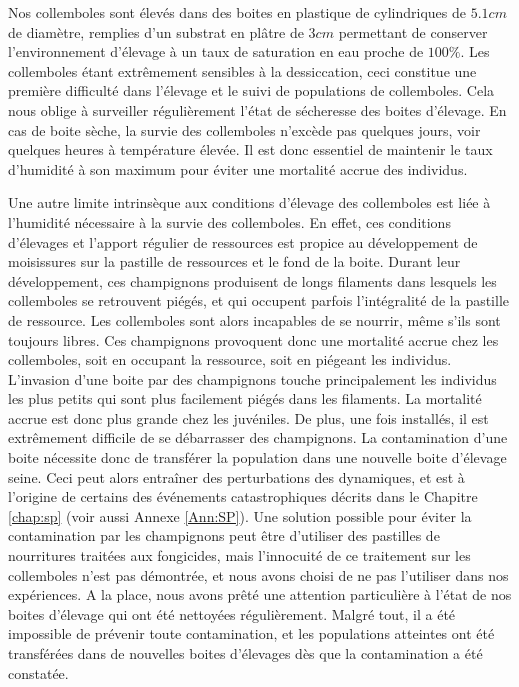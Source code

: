 Nos collemboles sont élevés dans des boites en plastique de cylindriques de
$5.1cm$ de diamètre, remplies d'un substrat en plâtre de $3cm$ permettant de
conserver l'environnement d'élevage à un taux de saturation en eau proche de $100\%$.
Les collemboles étant extrêmement sensibles à la dessiccation, ceci
constitue une première difficulté dans l'élevage et le suivi de populations de
collemboles. Cela nous oblige à surveiller régulièrement l'état de sécheresse
des boites d'élevage. En cas de boite sèche, la survie des collemboles n'excède
pas quelques jours, voir quelques heures à température élevée. Il est donc
essentiel de maintenir le taux d'humidité à son maximum pour éviter une
mortalité accrue des individus.

Une autre limite intrinsèque aux conditions d'élevage des collemboles est liée à
l'humidité nécessaire à la survie des collemboles. En effet, ces conditions
d'élevages et l'apport régulier de ressources est propice au développement de
moisissures sur la pastille de ressources et le fond de la boite. Durant leur
développement, ces champignons produisent de longs filaments dans lesquels les
collemboles se retrouvent piégés, et qui occupent parfois l'intégralité de la
pastille de ressource. Les collemboles sont alors incapables de se nourrir,
même s'ils sont toujours libres. Ces champignons provoquent donc une mortalité
accrue chez les collemboles, soit en occupant la ressource, soit en piégeant les
individus. L'invasion d'une boite par des champignons touche principalement les
individus les plus petits qui sont plus facilement piégés dans les filaments. La
mortalité accrue est donc plus grande chez les juvéniles. De plus, une fois
installés, il est extrêmement difficile de se débarrasser des champignons. La
contamination d'une boite nécessite donc de transférer la population dans une
nouvelle boite d'élevage seine. Ceci peut alors entraîner des perturbations des
dynamiques, et est à l'origine de certains des événements catastrophiques
décrits dans le Chapitre \ref{chap:sp} (voir aussi Annexe \ref{Ann:SP}). Une
solution possible pour éviter la contamination par les champignons peut être
d'utiliser des pastilles de nourritures traitées aux fongicides, mais
l'innocuité de ce traitement sur les collemboles n'est pas démontrée, et nous
avons choisi de ne pas l'utiliser dans nos expériences. A la place, nous avons
prêté une attention particulière à l'état de nos boites d'élevage qui ont été
nettoyées régulièrement. Malgré tout, il a été impossible de prévenir toute
contamination, et les populations atteintes ont été transférées dans de
nouvelles boites d'élevages dès que la contamination a été constatée.

